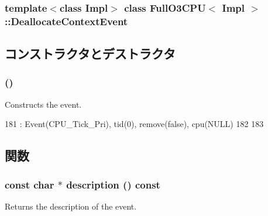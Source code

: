 \subsubsection*{template$<$class Impl$>$ class FullO3CPU$<$ Impl $>$::DeallocateContextEvent}



\subsection{コンストラクタとデストラクタ}
\hypertarget{classFullO3CPU_1_1DeallocateContextEvent_aae8f83c8487667ebbcfe7aef32c7468f}{
\subsubsection[{DeallocateContextEvent}]{ ()}}
\label{classFullO3CPU_1_1DeallocateContextEvent_aae8f83c8487667ebbcfe7aef32c7468f}
Constructs the event. 


\begin{DoxyCode}
181     : Event(CPU_Tick_Pri), tid(0), remove(false), cpu(NULL)
182 {
183 }
\end{DoxyCode}


\subsection{関数}
\hypertarget{classFullO3CPU_1_1DeallocateContextEvent_a5a14fe478e2393ff51f02e9b7be27e00}{
\subsubsection[{description}]{\setlength{\rightskip}{0pt plus 5cm}const char $\ast$ description () const}}
\label{classFullO3CPU_1_1DeallocateContextEvent_a5a14fe478e2393ff51f02e9b7be27e00}
Returns the description of the event. 

